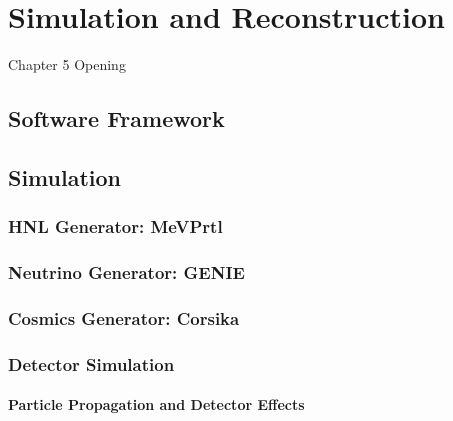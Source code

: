 \chapter{Simulation and Reconstruction}

\ifpdf
    \graphicspath{{Chapter5/Figs/Raster/}{Chapter5/Figs/PDF/}{Chapter4/Figs/}}
\else
    \graphicspath{{Chapter5/Figs/Vector/}{Chapter5/Figs/}}
\fi


Chapter 5 Opening

\newpage

\section{Software Framework}

\section{Simulation}
\subsection{HNL Generator: MeVPrtl}
\subsection{Neutrino Generator: GENIE}
\subsection{Cosmics Generator: Corsika}
\subsection{Detector Simulation}
\subsubsection{Particle Propagation and Detector Effects}


